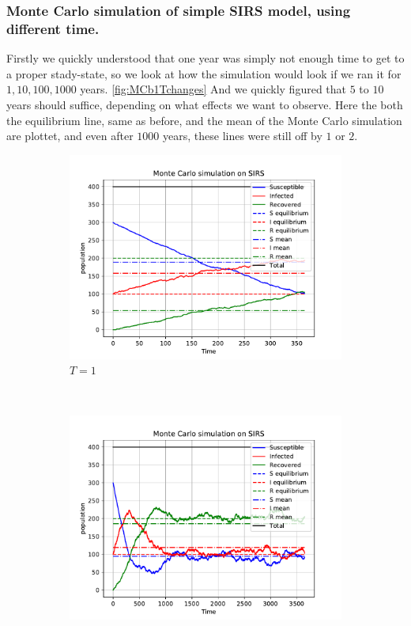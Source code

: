 \subsubsection{Monte Carlo simulation of simple SIRS model, using different time.}
	Firstly we quickly understood that one year was simply not enough time to get to a proper stady-state, so we look at how the simulation would look if we ran it for $1,10,100,1000$ years. \ref{fig:MCb1Tchanges} And we quickly figured that $5$ to $10$ years should suffice, depending on what effects we want to observe. Here the both the equilibrium line, same as before, and the mean of the Monte Carlo simulation are plottet, and even after $1000$ years, these lines were still off by $1$ or $2$. 

\begin{figure}[H]
    \centering
    \begin{subfigure}{0.49\textwidth}
        \centering
        \includegraphics[width=\linewidth]{../fig/newfig/MC_b1T1.pdf}
        \caption{$T = 1$}
    \end{subfigure}%
     ~ 
    \begin{subfigure}{0.49\textwidth}
         \centering
         \includegraphics[width=\linewidth]{../fig/newfig/MC_b1T10.pdf}

\end{subfigure}
\end{figure}
